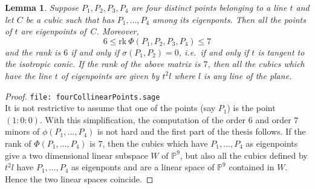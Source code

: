\documentclass[11pt, a4paper, reqno, captions=tableheading,bibliography=totoc]{scrartcl}
\theoremstyle{plain}
\newtheorem{lemma}{Lemma}[section]
\theoremstyle{definition}
\newcommand{\rk}{\ensuremath{\mathrm{rk}}}
\begin{document}
\begin{lemma}
\label{4ptiSuRetta2}
Suppose $P_1, P_2, P_3, P_4$ are four distinct points belonging to a line $t$
and let
$C$ be a cubic such that has $P_1, \dots, P_4$ among its eigenponts. Then
all the points of $t$ are eigenpoints of~$C$. Moreover,
\begin{equation*}
6 \leq \rk  \  \Phi(P_1, P_2, P_3, P_4) \leq 7
\end{equation*}
and the rank is $6$ if and only if $\sigma(P_1, P_2) = 0$, i.e.\ if
and only if $t$ is tangent to the isotropic conic. If the rank of
the above matrix is $7$, then all the cubics which have the line $t$
of eigenpoints are given by $t^2l$ where $l$ is any line of the plane. 
\end{lemma}
\begin{proof}
\verb+file: fourCollinearPoints.sage+\\
It is not restrictive to assume that one of the points (say $P_1$) is
the point $(1: 0: 0)$. 
With this simplification, the computation of the order $6$ and order $7$
minors of $\phi(P_1, \dots, P_4)$ is not hard and 
the first part of the thesis follows. If the rank of $\Phi(P_1, \dots, P_4)$
is $7$, then the cubics which have $P_1, \dots, P_4$ as eigenpoints
give a two dimensional linear subspace $W$ of $\mathbb{P}^9$, but also all
the cubics defined by $t^2l$ have $P_1, \dots, P_4$ as eigenponts and are
a linear space of $\mathbb{P}^9$ contained in $W$. Hence the two linear
spaces coincide.
\end{proof}
\end{document}
